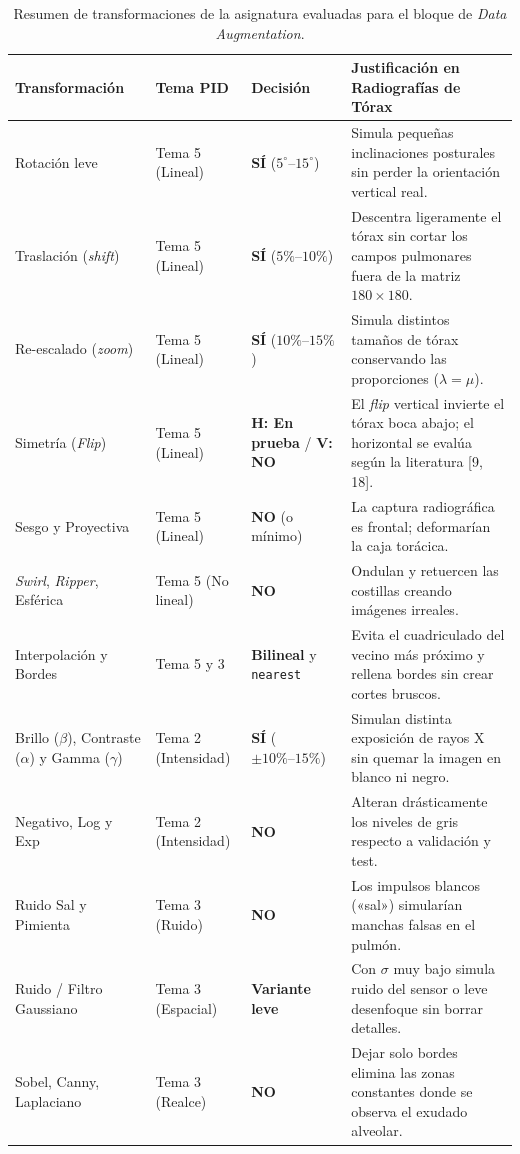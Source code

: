 \documentclass[11pt, a4paper]{article}
\numberwithin{equation}{section}
\begin{document}
\begin{table}[htbp]
\centering
\caption{Resumen de transformaciones de la asignatura evaluadas para el bloque de \textit{Data Augmentation}.}
\label{tab:resumen_da}
\footnotesize
\renewcommand{\arraystretch}{1.18}
\begin{tabular}{p{3.5cm} p{2.3cm} p{2.4cm} p{6.2cm}}
\hline
\textbf{Transformación} & \textbf{Tema PID} & \textbf{Decisión} & \textbf{Justificación en Radiografías de Tórax} \\
\hline
Rotación leve & Tema 5 (Lineal) & \textbf{SÍ} ($5^\circ\text{--}15^\circ$) & Simula pequeñas inclinaciones posturales sin perder la orientación vertical real. \\
Traslación (\textit{shift}) & Tema 5 (Lineal) & \textbf{SÍ} ($5\%\text{--}10\%$) & Descentra ligeramente el tórax sin cortar los campos pulmonares fuera de la matriz $180\times 180$. \\
Re-escalado (\textit{zoom}) & Tema 5 (Lineal) & \textbf{SÍ} ($10\%\text{--}15\%$) & Simula distintos tamaños de tórax conservando las proporciones ($\lambda = \mu$). \\
Simetría (\textit{Flip}) & Tema 5 (Lineal) & \textbf{H: En prueba} / \textbf{V: NO} & El \textit{flip} vertical invierte el tórax boca abajo; el horizontal se evalúa según la literatura [9, 18]. \\
Sesgo y Proyectiva & Tema 5 (Lineal) & \textbf{NO} (o mínimo) & La captura radiográfica es frontal; deformarían la caja torácica. \\
\textit{Swirl}, \textit{Ripper}, Esférica & Tema 5 (No lineal) & \textbf{NO} & Ondulan y retuercen las costillas creando imágenes irreales. \\
Interpolación y Bordes & Tema 5 y 3 & \textbf{Bilineal} y \texttt{nearest} & Evita el cuadriculado del vecino más próximo y rellena bordes sin crear cortes bruscos. \\
Brillo ($\beta$), Contraste ($\alpha$) y Gamma ($\gamma$) & Tema 2 (Intensidad) & \textbf{SÍ} ($\pm 10\%\text{--}15\%$) & Simulan distinta exposición de rayos X sin quemar la imagen en blanco ni negro. \\
Negativo, Log y Exp & Tema 2 (Intensidad) & \textbf{NO} & Alteran drásticamente los niveles de gris respecto a validación y test. \\
Ruido Sal y Pimienta & Tema 3 (Ruido) & \textbf{NO} & Los impulsos blancos («sal») simularían manchas falsas en el pulmón. \\
Ruido / Filtro Gaussiano & Tema 3 (Espacial) & \textbf{Variante leve} & Con $\sigma$ muy bajo simula ruido del sensor o leve desenfoque sin borrar detalles. \\
Sobel, Canny, Laplaciano & Tema 3 (Realce) & \textbf{NO} & Dejar solo bordes elimina las zonas constantes donde se observa el exudado alveolar. \\
\hline
\end{tabular}
\end{table}
\end{document}
